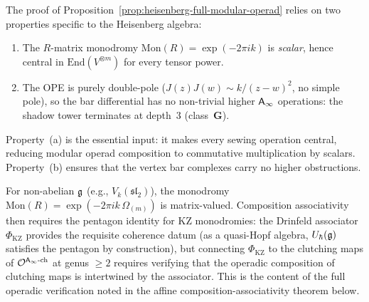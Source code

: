\begin{remark}
\label{rem:heisenberg-full-modular-scope}
The proof of
Proposition~\ref{prop:heisenberg-full-modular-operad}
relies on two properties specific to the Heisenberg
algebra:
\begin{enumerate}[label=\textup{(\alph*)}]
\item The $R$-matrix monodromy
 $\mathrm{Mon}(R) = \exp(-2\pi ik)$ is \emph{scalar},
 hence central in $\mathrm{End}(V^{\otimes m})$ for
 every tensor power.
\item The OPE is purely double-pole
 ($J(z)J(w) \sim k/(z-w)^2$, no simple pole),
 so the bar differential has no non-trivial
 higher $\mathsf{A}_{\infty}$ operations: the shadow tower
 terminates at depth~$3$ (class~$\mathbf{G}$).
\end{enumerate}
Property~(a) is the essential input: it makes every
sewing operation central, reducing modular operad
composition to commutative multiplication by
scalars. Property~(b) ensures that the vertex bar
complexes carry no higher obstructions.

For non-abelian $\mathfrak{g}$ (e.g.,
$V_k(\mathfrak{sl}_2)$), the monodromy
$\mathrm{Mon}(R) = \exp(-2\pi ik\,\Omega_{(m)})$
is matrix-valued. Composition associativity then
requires the pentagon identity for KZ monodromies:
the Drinfeld associator $\Phi_{\mathrm{KZ}}$ provides
the requisite coherence datum (as a quasi-Hopf
algebra, $U_\hbar(\mathfrak{g})$ satisfies the pentagon
by construction), but connecting $\Phi_{\mathrm{KZ}}$
to the clutching maps of
$\mathcal{O}^{\mathsf{A}_{\infty}\textup{-ch}}$ at genus $\ge 2$
requires verifying that the operadic composition
of clutching maps is intertwined by the associator.
This is the content of the full operadic verification
noted in the affine composition-associativity theorem below.
\end{remark}

